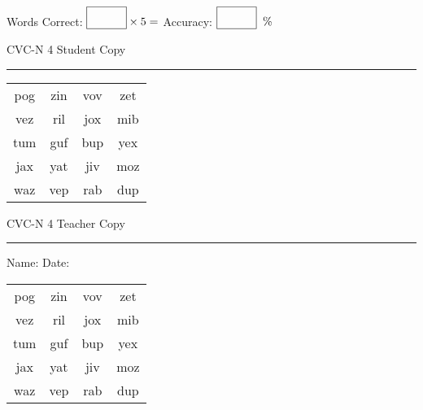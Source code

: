 \documentclass{memoir}
\begin{document}
\small

Words Correct: $\fbox{\phantom{\huge 100}} \times 5 = $ Accuracy: $\fbox{\phantom{\huge 100}}\;\; \%$ 

\vfill

\newpage


\footnotesize \noindent
CVC-N 4 \hfill Student Copy
\smallskip
\hrule

\Large

\setlength{\tabcolsep}{14pt}
\def\arraystretch{2}

{\selectfont


\begin{vplace}[0.5]
\begin{center}
\begin{tabular}{cccc}
pog & zin & vov & zet \\
vez & ril & jox & mib \\
tum & guf & bup & yex \\
jax & yat & jiv & moz \\
waz & vep & rab & dup \\
\end{tabular}
\end{center}
\end{vplace}

}

\newpage

\footnotesize \noindent
CVC-N 4 \hfill Teacher Copy
\smallskip
\hrule

\small

\vfill

\noindent
Name: \underline{\hspace{1.75in}} \hfill Date: \underline{\hspace{1in}}

\Large

{\selectfont


\begin{vplace}[0.5]
\begin{center}
\begin{tabular}{cccc}
pog & zin & vov & zet \\
vez & ril & jox & mib \\
tum & guf & bup & yex \\
jax & yat & jiv & moz \\
waz & vep & rab & dup \\
\end{tabular}
\end{center}
\end{vplace}



}
\end{document}
